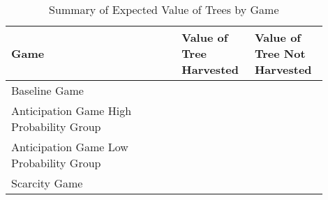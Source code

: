 \begin{table}[htbp!]
  \centering
  \caption{Summary of Expected Value of Trees by Game}\label{tab:4}
  \begin{tabular}{p{0.5\linewidth}|p{0.2\linewidth}|p{0.2\linewidth}}
    \toprule
    \textbf{Game} & \textbf{Value of Tree Harvested} & \textbf{Value of Tree Not Harvested} \\ \hline \hline
    Baseline Game & \centering{2} & \centering{4} \\
    \midrule
    Anticipation Game High Probability Group & \centering{2} & \centering{2.4}  \\
    Anticipation Game Low Probability Group & \centering{2} & \centering{3.6}  \\
    \midrule
    Scarcity Game & \centering{2} & \centering{4} \\
    \bottomrule
  \end{tabular}
\end{table}
